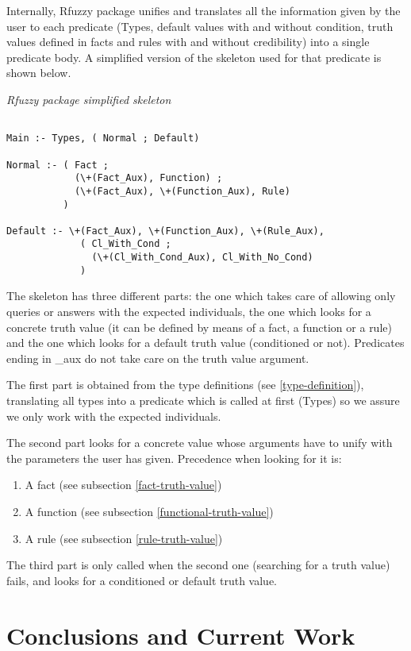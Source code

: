 \documentclass[runningheads,a4paper]{llncs}
\begin{document}
Internally, Rfuzzy package unifies and translates all the information
given by the user to each predicate 
(Types, default values with and without condition, truth values
defined in facts and rules with and without credibility) 
into a single predicate body. 
A simplified version of the skeleton used for that predicate is shown
below.

\medskip
\noindent
{\it Rfuzzy package simplified skeleton }
\begin{verbatim}

Main :- Types, ( Normal ; Default)
 
Normal :- ( Fact ; 
            (\+(Fact_Aux), Function) ;  
            (\+(Fact_Aux), \+(Function_Aux), Rule) 
          )

Default :- \+(Fact_Aux), \+(Function_Aux), \+(Rule_Aux), 
             ( Cl_With_Cond ; 
               (\+(Cl_With_Cond_Aux), Cl_With_No_Cond) 
             )

\end{verbatim}

The skeleton has three different parts: the one which takes care of
allowing only queries or answers with the expected individuals, 
the one which looks for a concrete truth value (it can be defined
by means of a fact, a function or a rule) and the one which 
looks for a default truth value (conditioned or not).
Predicates ending in \_aux do not take care on the 
truth value argument. 

The first part is obtained from the type definitions (see \ref{type-definition}),
translating all types into a predicate which is called at 
first (Types) so we assure we only work with the expected 
individuals. 

The second part looks for a concrete value whose arguments have to unify 
with the parameters the user has given. 
Precedence when looking for it is: 
\begin{enumerate}
\item A fact (see subsection \ref{fact-truth-value})
\item A function (see subsection \ref{functional-truth-value})
\item A rule (see subsection \ref{rule-truth-value})
\end{enumerate}

The third part is only called when the second one (searching for a 
truth value) fails, and looks for a conditioned or default truth value.



\section{Conclusions and Current Work}
\end{document}
